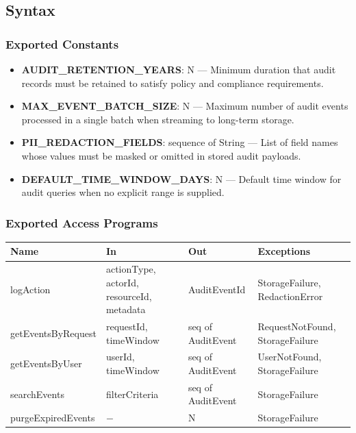 \documentclass[12pt, titlepage]{article}
\begin{document}
\subsection{Syntax}

\subsubsection{Exported Constants}

\begin{itemize}
  \item \textbf{AUDIT\_RETENTION\_YEARS}: N --- Minimum duration that audit records must be retained to satisfy policy and compliance requirements.
  \item \textbf{MAX\_EVENT\_BATCH\_SIZE}: N --- Maximum number of audit events processed in a single batch when streaming to long-term storage.
  \item \textbf{PII\_REDACTION\_FIELDS}: sequence of String --- List of field names whose values must be masked or omitted in stored audit payloads.
  \item \textbf{DEFAULT\_TIME\_WINDOW\_DAYS}: N --- Default time window for audit queries when no explicit range is supplied.
\end{itemize}

\subsubsection{Exported Access Programs}

\begin{center}
\begin{tabular}{p{2.8cm} p{4.2cm} p{4.2cm} p{2.4cm}}
\toprule
\textbf{Name} & \textbf{In} & \textbf{Out} & \textbf{Exceptions} \\
\midrule
logAction & actionType, actorId, resourceId, metadata & AuditEventId & StorageFailure, RedactionError \\
getEventsByRequest & requestId, timeWindow & seq of AuditEvent & RequestNotFound, StorageFailure \\
getEventsByUser & userId, timeWindow & seq of AuditEvent & UserNotFound, StorageFailure \\
searchEvents & filterCriteria & seq of AuditEvent & StorageFailure \\
purgeExpiredEvents & $-$ & N & StorageFailure \\
\bottomrule
\end{tabular}
\end{center}
\end{document}
